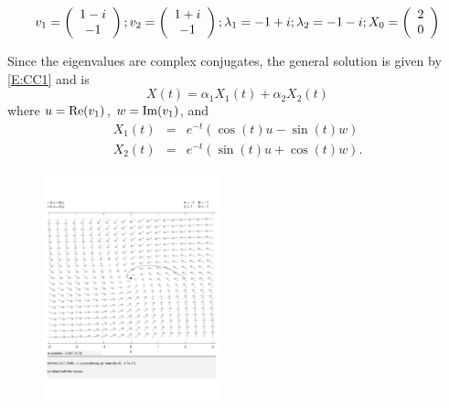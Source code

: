 \documentclass{ximera}
\begin{document}
\begin{exercise} \label{A6.4.3}
\[
v_1 = \left(\begin{array}{cccccccccccc}  1 -i \\ -1 \end{array}\right); v_2 = \left(\begin{array}{cccccccccccc}  1 + i \\ -1  \end{array}\right); \lambda_1 = -1+i;  \lambda_2 = -1-i; X_0 = \left(\begin{array}{rrrrrrrrrrrrrrrrrr} 2 \\ 0 \end{array}\right)
\]

\begin{solution}
\soln Since the eigenvalues are complex conjugates, the general solution is given by \eqref{E:CC1} and is
\[
X(t) = \alpha_1 X_1(t) + \alpha_2 X_2(t)
\]
where $u={\rm Re}(v_1)$, $w={\rm Im}(v_1)$, and 
\[
\begin{array}{rcl}
X_1(t) & = & e^{-t}(\cos(t)u -\sin(t)w)\\
X_2(t) & = & e^{-t}(\sin(t)u +\cos(t)w).
\end{array}
\]
\begin{figure}[htb]
           \centerline{%
           \includegraphics[width=2.0in]{exfigure/A6_4_3a.pdf}}
\end{figure}
\end{solution}
\end{exercise}
\end{document}
